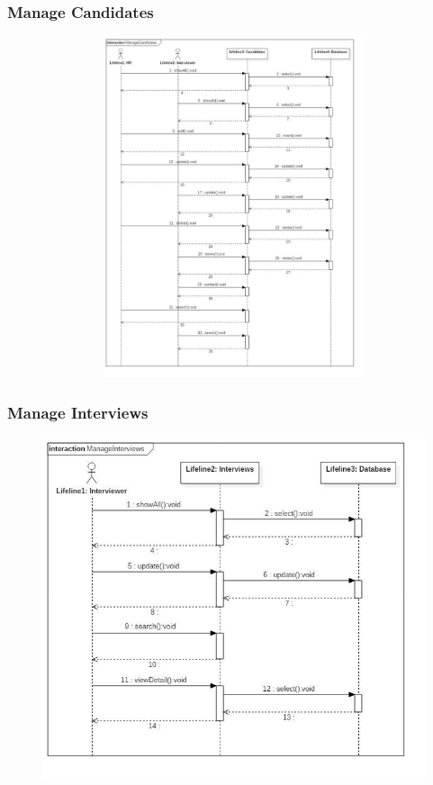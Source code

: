 \documentclass[a4paper]{article}
\begin{document}
\subsubsection{Manage Candidates}
\includegraphics[width=15cm, height=10cm]{Diagram/ManageCandidate} \\
\subsubsection{Manage Interviews}
\includegraphics[width=15cm, height=10cm]{Diagram/ManageInterview} \\
\end{document}
